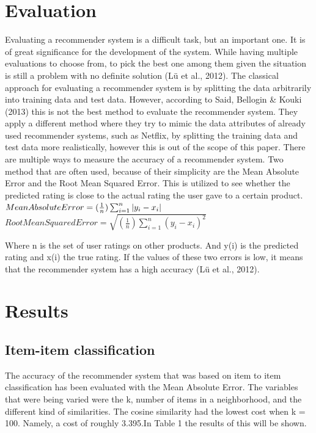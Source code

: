 \documentclass[11pt]{article}
\begin{document}
\section{Evaluation}

Evaluating a recommender system is a difficult task, but an important one. It is of great significance for the development of the system. While having multiple evaluations to choose from, to pick the best one among them given the situation is still a problem with no definite solution (Lü et al., 2012).  The classical approach for evaluating a recommender system is by splitting the data arbitrarily into training data and test data. However, according to Said, Bellogin & Kouki (2013) this is not the best method to evaluate the recommender system. They apply a different method where they try to mimic the data attributes of already used recommender systems, such as Netflix, by splitting the training data and test data more realistically, however this is out of the scope of this paper. There are multiple ways to measure the accuracy of a recommender system. Two method that are often used, because of their simplicity are the Mean Absolute Error and the Root Mean Squared Error. This is utilized to see whether the predicted rating is close to the actual rating the user gave to a certain product. \\
\m
$Mean Absolute Error =  (\frac{1}{n})\sum_{i=1}^{n}\left | y_{i} - x_{i} \right |\\
$$Root Mean Squared Error = \sqrt{(\frac{1}{n})\sum_{i=1}^{n}(y_{i} - x_{i})^{2}} $

Where n is the set of user ratings on other products. And y(i) is the predicted rating and x(i)  the true rating. 
If the values of these two errors is low, it means that the recommender system has a high accuracy (Lü et al., 2012). 

\section{Results}
\subsection{Item-item classification}
The accuracy of the recommender system that was based on item to item classification has been evaluated with the Mean Absolute Error. The variables that were being varied were the k, number of items in a neighborhood, and the different kind of similarities. The cosine similarity had the lowest cost when k = 100. Namely, a cost of roughly 3.395.In Table 1 the results of this will be shown.\\
 
\end{document}
